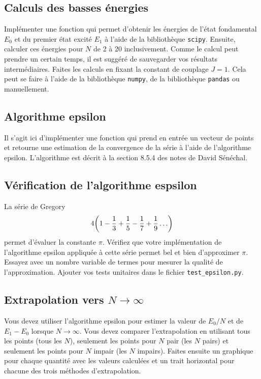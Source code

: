 \documentclass[12pt, letterpaper]{article}
\begin{document}
\subsection{Calculs des basses énergies}\label{subsec:calculs-des-basses-energies}

\noindent Implémenter une fonction qui permet d'obtenir les énergies de l'état fondamental
$E_0$ et du premier état excité $E_1$ à l'aide de la bibliothèque \texttt{scipy}.
Ensuite, calculer ces énergies pour $N$ de 2 à 20 inclusivement.
Comme le calcul peut prendre un certain temps, il est suggéré de
sauvegarder vos résultats intermédiaires.
Faites les calculs en fixant la constant de couplage $J = 1$.
Cela peut se faire à l'aide de la bibliothèque \texttt{numpy},
de la bibliothèque \texttt{pandas} ou manuellement.


\subsection{Algorithme epsilon}\label{subsec:algorithme-epsilon}

\noindent Il s'agit ici d'implémenter une fonction qui prend en entrée
un vecteur de points et
retourne une estimation de la convergence de la série à l'aide
de l'algorithme epsilon.
L'algorithme est décrit à la section 8.5.4 des notes de David Sénéchal.


\subsection{Vérification de l'algorithme espsilon}\label{subsec:verification-de-l'algorithme-espsilon}

\noindent La série de Gregory
\begin{equation}
  4\qty(1 - \frac{1}{3} + \frac{1}{5} - \frac{1}{7} + \frac{1}{9} \ldots)
\end{equation}
permet d'évaluer la constante $\pi$.
Vérifiez que votre implémentation de l'algorithme epsilon appliquée à
cette série permet bel et bien d'approximer $\pi$.
Essayez avec un nombre variable de termes pour mesurer la qualité de l'approximation.
Ajouter vos tests unitaires dans le fichier \texttt{test\_epsilon.py}.


\subsection{Extrapolation vers $N \to \infty$}\label{subsec:extrapolation-vers-n-to-infty}

\noindent Vous devez utiliser l'algorithme epsilon
pour estimer la valeur de $E_0 / N$ et de $E_1 - E_0$ lorsque $N \to \infty$.
Vous devez comparer l'extrapolation en utilisant tous les points (tous les $N$),
seulement les points pour $N$ pair (les $N$ pairs) et seulement les points pour $N$ impair (les $N$ impairs).
Faites ensuite un graphique pour chaque quantité avec les valeurs calculées
et un trait horizontal pour chacune des trois méthodes d'extrapolation.
\end{document}
